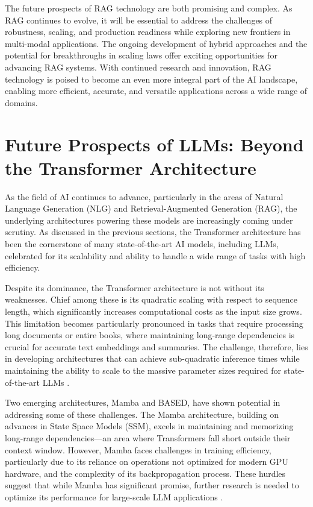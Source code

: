 The future prospects of RAG technology are both promising and complex. As RAG continues to evolve, it will be essential to address the challenges of robustness, scaling, and production readiness while exploring new frontiers in multi-modal applications. The ongoing development of hybrid approaches and the potential for breakthroughs in scaling laws offer exciting opportunities for advancing RAG systems. With continued research and innovation, RAG technology is poised to become an even more integral part of the AI landscape, enabling more efficient, accurate, and versatile applications across a wide range of domains.

\section{Future Prospects of LLMs: Beyond the Transformer Architecture}

As the field of AI continues to advance, particularly in the areas of Natural Language Generation (NLG) and Retrieval-Augmented Generation (RAG), the underlying architectures powering these models are increasingly coming under scrutiny. As discussed in the previous sections, the Transformer architecture has been the cornerstone of many state-of-the-art AI models, including LLMs, celebrated for its scalability and ability to handle a wide range of tasks with high efficiency.

Despite its dominance, the Transformer architecture is not without its weaknesses. Chief among these is its quadratic scaling with respect to sequence length, which significantly increases computational costs as the input size grows. This limitation becomes particularly pronounced in tasks that require processing long documents or entire books, where maintaining long-range dependencies is crucial for accurate text embeddings and summaries. The challenge, therefore, lies in developing architectures that can achieve sub-quadratic inference times while maintaining the ability to scale to the massive parameter sizes required for state-of-the-art LLMs \cite{paull2023transformer}.

Two emerging architectures, Mamba and BASED, have shown potential in addressing some of these challenges. The Mamba architecture, building on advances in State Space Models (SSM), excels in maintaining and memorizing long-range dependencies—an area where Transformers fall short outside their context window. However, Mamba faces challenges in training efficiency, particularly due to its reliance on operations not optimized for modern GPU hardware, and the complexity of its backpropagation process. These hurdles suggest that while Mamba has significant promise, further research is needed to optimize its performance for large-scale LLM applications \cite{gu2023mamba}.


